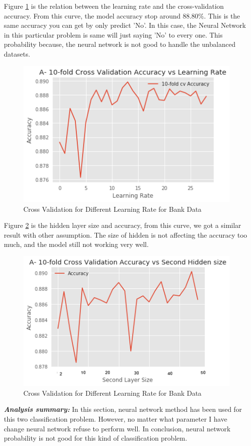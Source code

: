 \documentclass[10pt, conference, compsocconf]{IEEEtran}
\begin{document}
Figure \ref{fig:bank_nn_learing_rate} is the relation between the learning rate and the cross-validation accuracy. From this curve, the model accuracy stop around 88.80\%. This is the same accuracy you can get by only predict 'No'. In this case, the Neural Network in this particular problem is same will just saying 'No' to every one. This probability because, the neural network is not good to handle the unbalanced datasets. 
 
\begin{figure}[h]
	\centering
	\includegraphics[scale = 0.5]{image/bank_nn_learning_rate.png}
	\caption{Cross Validation for Different Learning Rate for Bank Data}
	\label{fig:bank_nn_learing_rate}
\end{figure}

Figure \ref{fig:bank_nn_layer} is the hidden layer size and accuracy, from this curve, we got a similar result with other assumption. The size of hidden is not affecting the accuracy too much, and the model still not working very well. 

\begin{figure}[h]
	\centering
	\includegraphics[scale = 0.5]{image/bank_nn_layersize.png}
	\caption{Cross Validation for Different Learning Rate for Bank Data}
	\label{fig:bank_nn_layer}
\end{figure}
\textit{\textbf{Analysis summary:}} In this section, neural network method has been used for this two classification problem. However, no matter what parameter I have change neural network refuse to perform well. In conclusion, neural network probability is not good for this kind of classification problem. 
\end{document}
